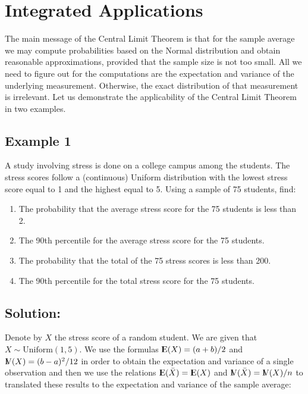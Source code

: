 \documentclass[]{krantz}
\newcommand{\Expec}{{\rm I\kern-.3em E}}
\newcommand{\Var}{{\rm I\kern-.3em V}}
\theoremstyle{definition}
\theoremstyle{definition}
\theoremstyle{definition}
\theoremstyle{remark}
\begin{document}
\hypertarget{integrated-applications}{%
\section{Integrated Applications}\label{integrated-applications}}

The main message of the Central Limit Theorem is that for the sample
average we may compute probabilities based on the Normal distribution
and obtain reasonable approximations, provided that the sample size is
not too small. All we need to figure out for the computations are the
expectation and variance of the underlying measurement. Otherwise, the
exact distribution of that measurement is irrelevant. Let us demonstrate
the applicability of the Central Limit Theorem in two examples.

\hypertarget{example-1}{%
\subsection{Example 1}\label{example-1}}

A study involving stress is done on a college campus among the students.
The stress scores follow a (continuous) Uniform distribution with the
lowest stress score equal to 1 and the highest equal to 5. Using a
sample of 75 students, find:

\begin{enumerate}
\def\labelenumi{\arabic{enumi}.}
\item
  The probability that the average stress score for the 75 students is
  less than 2.
\item
  The 90th percentile for the average stress score for the 75
  students.
\item
  The probability that the total of the 75 stress scores is less
  than 200.
\item
  The 90th percentile for the total stress score for the 75 students.
\end{enumerate}

\hypertarget{solution}{%
\subsection*{Solution:}\label{solution}}


Denote by \(X\) the stress score of a random student. We are given that
\(X \sim \mathrm{Uniform}(1,5)\). We use the formulas
\(\Expec(X) = (a+b)/2\) and \(\Var(X) = (b-a)^2/12\) in order to obtain the
expectation and variance of a single observation and then we use the
relations \(\Expec(\bar X) = \Expec(X)\) and \(\Var(\bar X) = \Var(X)/n\) to
translated these results to the expectation and variance of the sample
average:
\end{document}
